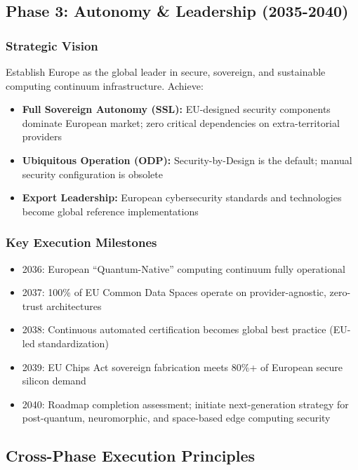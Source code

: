 \documentclass[12pt,a4paper]{article}
\begin{document}
\subsection*{Phase 3: Autonomy \& Leadership (2035-2040)}

\subsubsection*{Strategic Vision}
Establish Europe as the global leader in secure, sovereign, and sustainable computing continuum infrastructure. Achieve:
\begin{itemize}
    \item \textbf{Full Sovereign Autonomy (SSL):} EU-designed security components dominate European market; zero critical dependencies on extra-territorial providers
    \item \textbf{Ubiquitous Operation (ODP):} Security-by-Design is the default; manual security configuration is obsolete
    \item \textbf{Export Leadership:} European cybersecurity standards and technologies become global reference implementations
\end{itemize}

\subsubsection*{Key Execution Milestones}
\begin{itemize}
    \item 2036: European ``Quantum-Native''  computing continuum fully operational
    \item 2037: 100\% of EU Common Data Spaces operate on provider-agnostic, zero-trust architectures
    \item 2038: Continuous automated certification becomes global best practice (EU-led standardization)
    \item 2039: EU Chips Act sovereign fabrication meets 80\%+ of European secure silicon demand
    \item 2040: Roadmap completion assessment; initiate next-generation strategy for post-quantum, neuromorphic, and space-based edge computing security
\end{itemize}

\subsection*{Cross-Phase Execution Principles}
\end{document}
